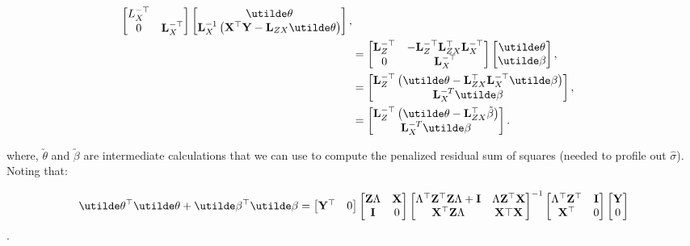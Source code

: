 \documentclass[10pt]{article}
\begin{document}
\begin{align*}
\begin{bmatrix}
{  L}_X^{-\top} \\
0 & {\bf L}_X^{-\top}
\end{bmatrix}
\begin{bmatrix}
\utilde\theta \\
{\bf L}_X^{-1}\left({\bf X}^\top{\bf Y} - {\bf L}_{ZX}\utilde\theta\right)
\end{bmatrix}, \\
%
& = \begin{bmatrix}
{\bf L}_Z^{-\top} & -{\bf L}_Z^{-\top}{\bf L}_{ZX}^\top{\bf
  L}_X^{-\top} \\
0 & {\bf L}_X^{-\top}
\end{bmatrix}
\begin{bmatrix}
\utilde\theta \\
\utilde\beta
\end{bmatrix}, \\
%
& = \begin{bmatrix}
{\bf L}_Z^{-\top}\left(\utilde\theta-{\bf L}_{ZX}^\top{\bf
    L}_X^{-\top}\utilde\beta\right) \\
{\bf L}_X^{-T}\utilde\beta
\end{bmatrix}, \\
& = \begin{bmatrix}
{\bf L}_Z^{-\top}\left(\utilde\theta-{\bf L}_{ZX}^\top\tilde{\beta}\right) \\
{\bf L}_X^{-T}\utilde\beta
\end{bmatrix}. \\
\end{align*}

\noindent where, $\utilde\theta$ and $\utilde\beta$ are intermediate
calculations that we can use to compute the penalized residual sum of
squares (needed to profile out $\hat\sigma$). Noting that:

\begin{equation*}
\utilde\theta^\top\utilde\theta +
\utilde\beta^\top\utilde\beta =
\begin{bmatrix}{\bf Y}^\top & 0 \end{bmatrix}
\begin{bmatrix}{\bf Z}\Lambda & {\bf X} \\ {\bf I} & 0\end{bmatrix}
\begin{bmatrix}\Lambda^\top {\bf Z}^\top {\bf Z}\Lambda + {\bf I} &
  \Lambda{\bf Z}^\top{\bf X} \\
{\bf X}^\top{\bf Z}\Lambda & {\bf X}\top{\bf X}
\end{bmatrix}^{-1}
\begin{bmatrix}\Lambda^\top{\bf Z}^\top & {\bf I} \\ {\bf X}^\top &
  0 \end{bmatrix}
\begin{bmatrix} {\bf Y} \\ 0\end{bmatrix}
\end{equation*}.
\end{document}
